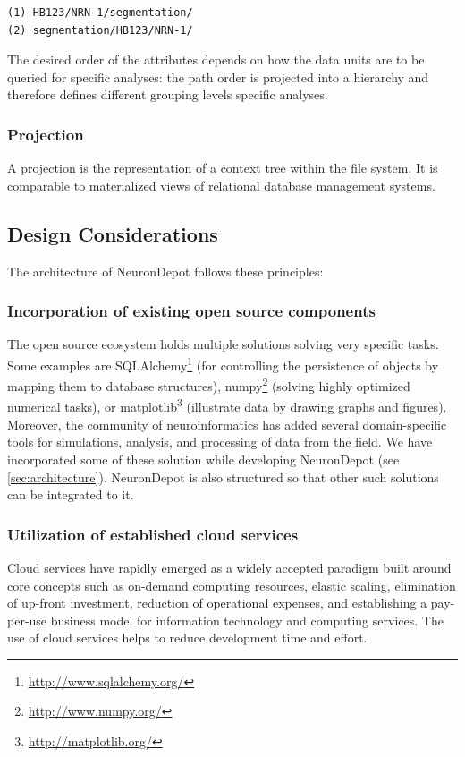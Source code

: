 \documentclass{frontiersSCNS} %
\begin{document}
\begin{lstlisting}[style=display]
(1) HB123/NRN-1/segmentation/
(2) segmentation/HB123/NRN-1/
\end{lstlisting}

The desired order of the attributes depends on how the data units are to be
queried for specific analyses: the path order is projected into a hierarchy and
therefore defines different grouping levels specific analyses.

\subsubsection{Projection}

A projection is the representation of a context tree within the file system. It
is comparable to materialized views of relational database management systems.


\subsection{Design Considerations}
The architecture of NeuronDepot follows these principles:

\subsubsection{Incorporation of existing open source components}

The open source ecosystem holds multiple solutions solving very specific tasks.
Some examples are SQLAlchemy\footnote{\url{http://www.sqlalchemy.org/}} (for
controlling the persistence of objects by mapping them to database structures),
numpy\footnote{\url{http://www.numpy.org/}} (solving highly optimized numerical
tasks), or matplotlib\footnote{\url{http://matplotlib.org/}} (illustrate data by
drawing graphs and figures). Moreover, the community of neuroinformatics has
added several domain-specific tools for simulations, analysis, and processing of
data from the field. We have incorporated some of these solution while
developing NeuronDepot (see \ref{sec:architecture}). NeuronDepot is also structured
so that other such solutions can be integrated to it.

\subsubsection{Utilization of established cloud services}

Cloud services have rapidly emerged as a widely accepted paradigm built around
core concepts such as on-demand computing resources, elastic scaling,
elimination of up-front investment, reduction of operational expenses, and
establishing a pay-per-use business model for information technology and
computing services. The use of cloud services helps to reduce development time
and effort.
\end{document}
